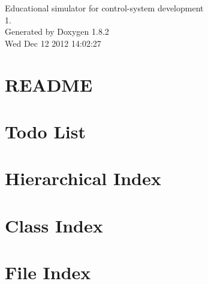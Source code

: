 \documentclass{book}
\begin{document}
\hypersetup{pageanchor=false,citecolor=blue}
\begin{titlepage}
\vspace*{7cm}
\begin{center}
{\Large Educational simulator for control-\/system development \\[1ex]\large 1. }\\
\vspace*{1cm}
{\large Generated by Doxygen 1.8.2}\\
\vspace*{0.5cm}
{\small Wed Dec 12 2012 14:02:27}\\
\end{center}
\end{titlepage}
\clearemptydoublepage
{}
\tableofcontents
\clearemptydoublepage
{}
\hypersetup{pageanchor=true,citecolor=blue}
\chapter{R\-E\-A\-D\-M\-E}
\label{index}\hypertarget{index}{}
\chapter{Todo List}
\label{todo}
\hypertarget{todo}{}

\chapter{Hierarchical Index}

\chapter{Class Index}

\chapter{File Index}

\end{document}
